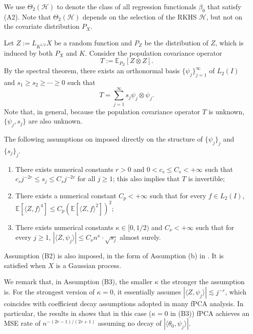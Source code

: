 \documentclass[11pt,a4paper]{article}
\theoremstyle{definition}
\theoremstyle{plain}
\theoremstyle{remark}
\newcommand{\mH}{\mathcal H}
\begin{document}
We use $\Theta_2(\mH)$ to denote the class of all regression functionals $\beta_0$ that satisfy (A2). Note that $\Theta_2(\mH)$ depends on the selection of the RKHS $\mH$, but not on the covariate distribution $P_X$.

Let $Z:=L_{K^{1/2}}X$ be a random function and $P_Z$ be the distribution of $Z$, which is induced by both $P_X$ and $K$. Consider the population covariance operator
$$
T := \mathbb E_{P_Z}\left[Z\otimes Z\right].
$$
By the spectral theorem, there exists an orthonormal basis $\{\psi_j\}_{j=1}^{\infty}$ of $L_2(I)$ and $s_1\geq s_2\geq\cdots\geq 0$ such that
\begin{equation}
T = \sum_{j=1}^{\infty} s_j\psi_j\otimes\psi_j.
\label{eq:specT}
\end{equation}
Note that, in general, because the population covariance operator $T$ is unknown, $\{\psi_j,s_j\}$ are also unknown.

The following assumptions on imposed directly on the structure of $\{\psi_j\}_j$ and $\{s_j\}_j$.
\begin{enumerate}
\item[(B1)] There exists numerical constants $r>0$ and $0<c_s\leq C_s<+\infty$ such that $c_s j^{-2r}\leq s_j\leq C_sj^{-2r}$ for all $j\geq 1$;
this also implies that $T$ is invertible;
\item[(B2)] There exists a numerical constant $C_p<+\infty$ such that for every $f\in L_2(I)$, $\mathbb E[\langle Z,f\rangle^4] \leq C_p(\mathbb E[\langle Z,f\rangle^2])^2$;
\item[(B3)] There exists numerical constants $\kappa\in[0,1/2)$ and $C_\nu<+\infty$ such that for every $j\geq 1$, $|\langle Z,\psi_j\rangle| \leq C_\nu n^{\kappa}\cdot \sqrt{s_j}$ almost surely.
\end{enumerate}

Assumption (B2) is also imposed, in the form of Assumption (b) in \citep{yuan2010reproducing}. It is satisfied when $X$ is a Gaussian process.

We remark that, in Assumption (B3), the smaller $\kappa$ the stronger the assumption is. For the strongest version of $\kappa=0$, it essentially assumes $|\langle Z,\psi_j\rangle|\lesssim j^{-r}$,
which coincides with coefficient decay assumptions adopted in many fPCA analysis.
{\color{red}In particular, the results in \cite{cai2006prediction} shows that in this case ($\kappa=0$ in (B3)) fPCA achieves an MSE rate of $n^{-(2r-1)/(2r+1)}$ assuming no decay of $|\langle\theta_0,\psi_j\rangle|$.}
\end{document}
